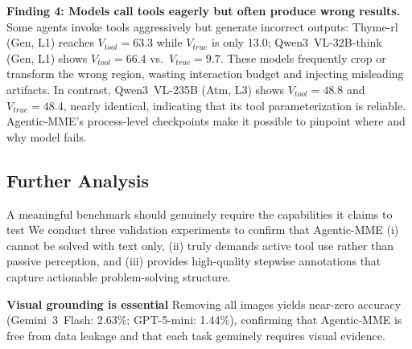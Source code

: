 \documentclass[runningheads]{llncs}
\theoremstyle{plain}
\theoremstyle{definition}
\theoremstyle{remark}
\begin{document}
\vspace{1mm}
\noindent\textbf{Finding 4: Models call tools eagerly but often produce
wrong results.} Some agents invoke tools aggressively but generate incorrect
outputs: Thyme-rl (Gen, L1) reaches $V_{\mathit{tool}}=63.3$ while
$V_{\mathit{true}}$ is only 13.0; Qwen3~VL-32B-think (Gen, L1) shows
$V_{\mathit{tool}}=66.4$ vs.\ $V_{\mathit{true}}=9.7$.
These models frequently crop or transform the wrong region, wasting
interaction budget and injecting misleading artifacts.
In contrast, Qwen3~VL-235B (Atm, L3) shows
$V_{\mathit{tool}}=48.8$ and $V_{\mathit{true}}=48.4$, nearly
identical, indicating that its tool parameterization is reliable. Agentic-MME's process-level checkpoints make it possible to pinpoint where and why model fails.
\subsection{Further Analysis}
\label{sec:fur}
A meaningful benchmark should genuinely require the capabilities it
claims to test We conduct three validation experiments to confirm that Agentic-MME
(i) cannot be solved with text only, (ii) truly demands
active tool use rather than passive perception, and (iii) provides
high-quality stepwise annotations that capture actionable problem-solving structure. 

\vspace{1mm}
\noindent\textbf{Visual grounding is essential}
Removing all images yields near-zero accuracy (Gemini~3~Flash: 2.63\%;
GPT-5-mini: 1.44\%), confirming that Agentic-MME is free from data leakage and that each task genuinely requires visual evidence.
\end{document}
